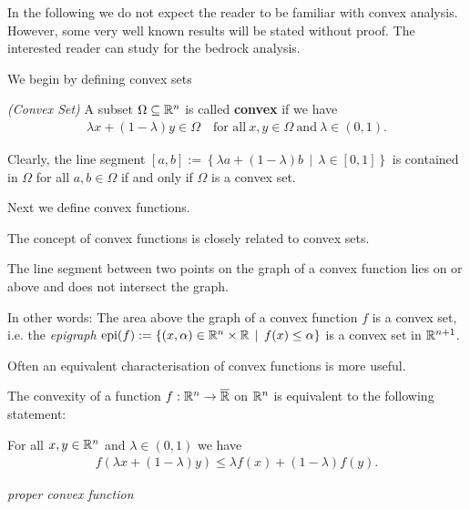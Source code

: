 In the following we do not expect the reader to be familiar with convex analysis. However, some very well known results will be stated without proof. The interested reader can study \cite{Mordukhovich2022} for the bedrock analysis.


We begin by defining convex sets
%

\begin{definition}
  \emph{(Convex Set)}
  A subset $\Omega\subseteq \mathbb{R}^n$ is called \textbf{convex} if we have 
  \begin{gather}
    \lambda x + (1-\lambda) y\in \Omega 
    \quad
    \text{for all}\ 
    x,y\in \Omega 
    \
    \text{and}\ 
    \lambda\in (0,1). 
  \end{gather}
\end{definition}

Clearly, the line segment 
$[a,b]:=\left\{ \lambda a+(1-\lambda)b\,\mid \, \lambda\in [0,1] \right\}$ is contained in $\Omega$ for all $a,b\in \Omega$ if and only if $\Omega$ is a convex set.
%

Next we define convex functions. 
%

The concept of convex functions is closely related to convex sets.
%  
 
The line segment between two points on the graph of a convex function lies on or above and does not intersect the graph.
%

In other words: The area above the graph of a convex function $f$ is a convex set, i.e. the \textit{epigraph}
$\text{epi}(f):=\left\{ (x,\alpha)\in \mathbb{R}^n\times\mathbb{R}\,\mid\, f(x)\le \alpha\right\}$ is a convex set in $\mathbb{R}^{n+1}$.
%

Often an equivalent characterisation of convex functions is more useful.
%

\begin{theorem}
  The convexity of a function $f:\mathbb{R}^n\to \overline{\mathbb{R}}$ on $\mathbb{R}^n$ is equivalent to the following statement:

  For all $x,y\in \mathbb{R}^n$ and $\lambda\in(0,1)$ we have 
    \begin{align}
      f(\lambda x + (1-\lambda)y)\le \lambda f(x)+(1-\lambda)f(y).
    \end{align}
\end{theorem}


\begin{definition}
  \emph{proper convex function}
\end{definition}


